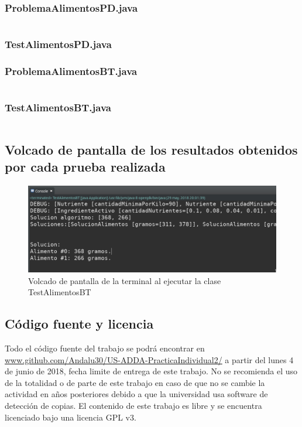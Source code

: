 \documentclass[a4paper,12pt]{article}
\begin{document}
\subsubsection{ProblemaAlimentosPD.java}
\inputminted[fontsize=\footnotesize,breaklines]{java}{src/andalu30/PracticaIndividual2/ProblemaAlimentosPD.java}
\subsubsection{TestAlimentosPD.java}

\subsubsection{ProblemaAlimentosBT.java}
\inputminted[fontsize=\footnotesize,breaklines]{java}{src/andalu30/PracticaIndividual2/ProblemaAlimentosBT.java}
\subsubsection{TestAlimentosBT.java}
\inputminted[fontsize=\footnotesize,breaklines]{java}{src/andalu30/PracticaIndividual2/TestAlimentosBT.java}



\subsection{Volcado de pantalla de los resultados obtenidos por cada prueba realizada}
\begin{figure}[H]
  \centering
  \includegraphics{btSinfiltro.png}
  \caption{Volcado de pantalla de la terminal al ejecutar la clase TestAlimentosBT}
  \label{fig:pli}
\end{figure}

\subsection{Código fuente y licencia}
Todo el código fuente del trabajo se podrá encontrar en \url{www.github.com/Andalu30/US-ADDA-PracticaIndividual2/}
a partir del lunes 4 de junio de 2018, fecha limite de entrega de este trabajo.
No se recomienda el uso de la totalidad o de parte de este trabajo en caso de que no se cambie la actividad en años posteriores debido a que la universidad usa software de detección de copias.
El contenido de este trabajo es libre y se encuentra licenciado bajo una licencia GPL v3.\\
\end{document}
